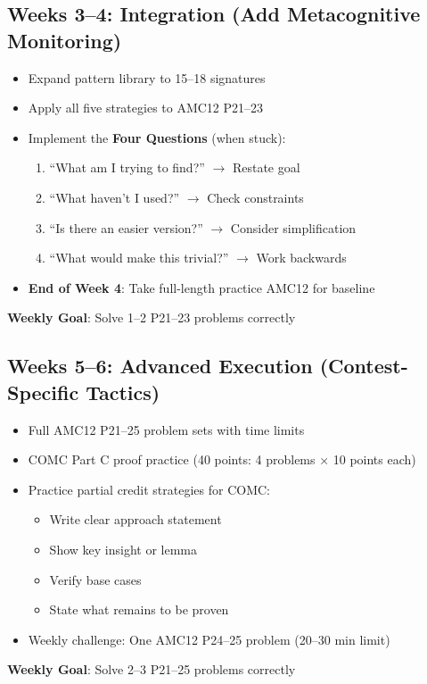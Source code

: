 \documentclass[]{article}
\begin{document}
\subsection{Weeks 3--4: Integration (Add Metacognitive Monitoring)}
\begin{itemize}[leftmargin=*]
    \item Expand pattern library to 15--18 signatures
    \item Apply all five strategies to AMC12 P21--23
    \item Implement the \textbf{Four Questions} (when stuck):
    \begin{enumerate}
        \item ``What am I trying to find?'' $\rightarrow$ Restate goal
        \item ``What haven't I used?'' $\rightarrow$ Check constraints
        \item ``Is there an easier version?'' $\rightarrow$ Consider simplification
        \item ``What would make this trivial?'' $\rightarrow$ Work backwards
    \end{enumerate}
    \item \textbf{End of Week 4}: Take full-length practice AMC12 for baseline
\end{itemize}
\textbf{Weekly Goal}: Solve 1--2 P21--23 problems correctly

\subsection{Weeks 5--6: Advanced Execution (Contest-Specific Tactics)}
\begin{itemize}[leftmargin=*]
    \item Full AMC12 P21--25 problem sets with time limits
    \item COMC Part C proof practice (40 points: 4 problems × 10 points each)
    \item Practice partial credit strategies for COMC:
    \begin{itemize}
        \item Write clear approach statement
        \item Show key insight or lemma
        \item Verify base cases
        \item State what remains to be proven
    \end{itemize}
    \item Weekly challenge: One AMC12 P24--25 problem (20--30 min limit)
\end{itemize}
\textbf{Weekly Goal}: Solve 2--3 P21--25 problems correctly
\end{document}
